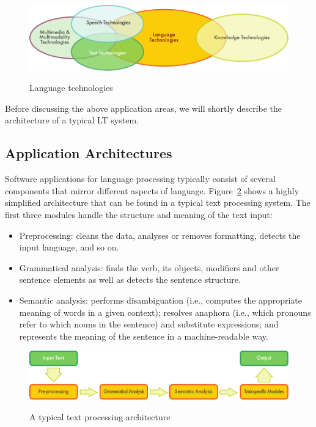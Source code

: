 \begin{multicols}{2}
\begin{figure}[htb]
  \center
  \includegraphics[width=\textwidth]{../_media/english/language_technologies}
  \caption{Language technologies}
\label{fig:lt}
\end{figure}

Before discussing the above application areas, we will shortly describe the architecture of a typical LT system.

\subsection{Application Architectures}
Software applications for language processing typically consist of several components that mirror different aspects of language.
Figure~\ref{fig:tpa} shows a highly simplified architecture that can be found in a typical text processing system.
The first three modules handle the structure and meaning of the text input:

\begin{itemize}
\item  Preprocessing: cleans the data, analyses or removes formatting, detects the input language, and so on.
\item  Grammatical analysis: finds the verb, its objects, modifiers and other sentence elements as well as detects the sentence structure.
\item  Semantic analysis: performs disambiguation (i.e., computes the appropriate meaning of words in a given context); resolves anaphora (i.e., which pronouns refer to which nouns in the sentence) and substitute expressions; and represents the meaning of the sentence in a machine-readable way.
\end{itemize}

\begin{figure}[htb]
  \center
  \includegraphics[width=\textwidth]{../_media/english/text_processing_app_architecture}
  \caption{A typical text processing architecture}
   \label{fig:textprocessingarch_en}
 \label{fig:tpa}
\end{figure}


\end{multicols}
